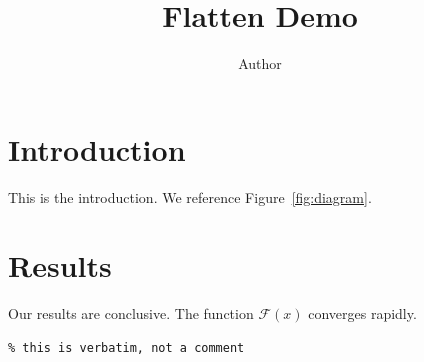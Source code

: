 \documentclass{article}
\title{Flatten Demo}
\author{Author}
\begin{document}
\maketitle

\section{Introduction}
This is the introduction. We reference Figure~\ref{fig:diagram}.
\newcommand{\specialFunc}{\mathcal{F}}
\section{Results}
Our results are conclusive. The function \(\specialFunc(x)\) converges rapidly.
\begin{verbatim}
% this is verbatim, not a comment

\end{verbatim}



\end{document}

